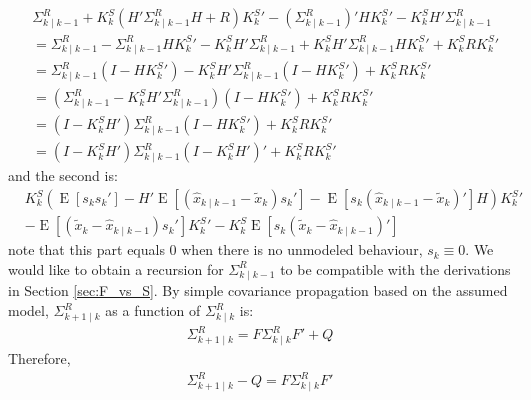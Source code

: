 \documentclass[oneside,12pt]{article}
\begin{document}
\begin{equation}
    \begin{split}
        &\Sigma^R_{k \mid k-1} + K_k^S \left( H'\Sigma^R_{k \mid k-1}H + R \right)K_k^S' -(\Sigma^R_{k \mid k-1})'H K_k^S' - K_k^S H'\Sigma^R_{k \mid k-1}\\
        &= \Sigma^R_{k \mid k-1} -\Sigma^R_{k \mid k-1}H K_k^S' - K_k^S H'\Sigma^R_{k \mid k-1} + K_k^SH'\Sigma^R_{k \mid k-1}HK_k^S' + K_k^S R K_k^S'\\
        &= \Sigma^R_{k \mid k-1}(I - H K_k^S') - K_k^S H'\Sigma^R_{k \mid k-1}(I - HK_k^S') + K_k^S R K_k^S'\\
        &= (\Sigma^R_{k \mid k-1} - K_k^S H'\Sigma^R_{k \mid k-1})(I - HK_k^S') + K_k^S R K_k^S'\\
        &= (I - K_k^S H')\Sigma^R_{k \mid k-1}(I - HK_k^S') + K_k^S R K_k^S'\\
        &= (I - K_k^S H')\Sigma^R_{k \mid k-1}(I - K_k^S H')' + K_k^S R K_k^S'
    \end{split}
\end{equation}
%
and the second is:
%
\begin{equation}
    \begin{split}
        &K_k^S \left( \operatorname{E}\left[ s_k s_k'\right]
        - H'\operatorname{E}\left[ (\hat{x}_{k \mid k-1} - \tilde{x}_k) s_k' \right] - \operatorname{E}\left[ s_k (\hat{x}_{k \mid k-1} - \tilde{x}_k)'\right]H \right) K_k^S'\\
        &- \operatorname{E}\left[ (\tilde{x}_k - \hat{x}_{k \mid k-1}) s_k'\right]  K_k^S' - K_k^S  \operatorname{E}\left[ s_k(\tilde{x}_k - \hat{x}_{k \mid k-1})'\right]
    \end{split}
\end{equation}
%
note that this part equals 0 when there is no unmodeled behaviour, $s_k \equiv 0$. We would like to obtain a recursion for $\Sigma^R_{k \mid k-1}$ to be compatible with the derivations in Section \ref{sec:F_vs_S}. By simple covariance propagation based on the assumed model, $\Sigma^R_{k+1 \mid k}$ as a function of $\Sigma^R_{k \mid k}$ is:
%
\begin{equation}
    \begin{split}
        \Sigma^R_{k+1 \mid k} = F\Sigma^R_{k \mid k}F' + Q
    \end{split}
\end{equation}
%
Therefore,
%
\begin{equation}\label{eq:CovTimeUpdate}
    \begin{split}
        \Sigma^R_{k+1 \mid k} - Q = F\Sigma^R_{k \mid k}F'
    \end{split}
\end{equation}
\end{document}

